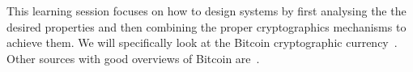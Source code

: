 This learning session focuses on how to design systems by first analysing the 
the desired properties and then combining the proper cryptographics mechanisms 
to achieve them.
We will specifically look at the Bitcoin cryptographic 
currency~\cite{Nakamoto2008bap}.
Other sources with good overviews of Bitcoin 
are~\cite{Peck2012btc,Kaminsky2013lct}.
